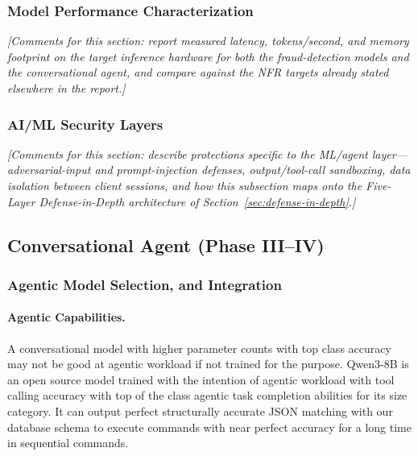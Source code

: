 \documentclass[12pt,a4paper]{report}
\begin{document}
\subsubsection{Model Performance Characterization}
\label{sec:model-performance-characterization}

\vspace{1.5cm}
\noindent\textit{[Comments for this section: report measured latency, tokens/second, and memory footprint on the target inference hardware for both the fraud-detection models and the conversational agent, and compare against the NFR targets already stated elsewhere in the report.]}
\vspace{1.5cm}

\subsubsection{AI/ML Security Layers}
\label{sec:aiml-security-layers}

\vspace{1.5cm}
\noindent\textit{[Comments for this section: describe protections specific to the ML/agent layer---adversarial-input and prompt-injection defenses, output/tool-call sandboxing, data isolation between client sessions, and how this subsection maps onto the Five-Layer Defense-in-Depth architecture of Section~\ref{sec:defense-in-depth}.]}
\vspace{1.5cm}


\subsection{Conversational Agent (Phase III--IV)}
\label{sec:optional-agent}

\subsubsection{Agentic Model Selection, and Integration}

\paragraph{Agentic Capabilities.} A conversational model with higher parameter counts with top class accuracy may not be good at agentic workload if not trained for the purpose. Qwen3-8B is an open source model trained with the intention of agentic workload with tool calling accuracy with top of the class agentic task completion abilities for its size category. It can output perfect structurally accurate JSON matching with our database schema to execute commands with near perfect accuracy for a long time in sequential commands.
\end{document}
